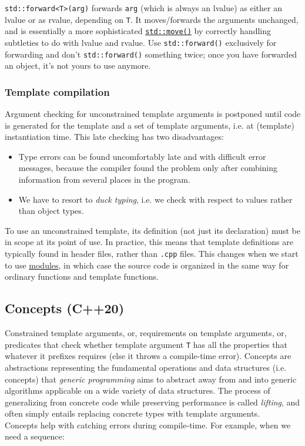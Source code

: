 \documentclass[table, xcdraw]{article}%
\begin{document}
\texttt{std::forward<T>(arg)} forwards \texttt{arg} (which is always an lvalue) as either an lvalue or as rvalue, depending on \texttt{T}. It moves/forwards the arguments unchanged, and is essentially a more sophisticated \href{}{\texttt{std::move()}} by correctly handling subtleties to do with lvalue and rvalue. Use \texttt{std::forward()} exclusively for forwarding and don't \texttt{std::forward()} something twice; once you have forwarded an object, it's not yours to use anymore.

\subsubsection{Template compilation}

Argument checking for unconstrained template arguments is postponed until code is generated for the template and a set of template arguments, i.e. at (template) instantiation time. This late checking has two disadvantages:

\begin{itemize}
    \item Type errors can be found uncomfortably late and with difficult error messages, because the compiler found the problem only after combining information from several places in the program.
    \item We have to resort to \emph{duck typing}, i.e. we check with respect to values rather than object types.
\end{itemize}

To use an unconstrained template, its definition (not just its declaration) must be in scope at its point of use. In practice, this means that template definitions are typically found in header files, rather than \texttt{.cpp} files. This changes when we start to use \hyperref[modules]{modules}, in which case the source code is organized in the same way for ordinary functions and template functions.

\subsection{Concepts (C++20)} \label{concepts}

Constrained template arguments, or, requirements on template arguments, or, predicates that check whether template argument \texttt{T} has all the properties that whatever it prefixes requires (else it throws a compile-time error). Concepts are abstractions representing the fundamental operations and data structures (i.e. concepts) that \emph{generic programming} aims to abstract away from and into generic algorithms applicable on a wide variety of data structures. The process of generalizing from concrete code while preserving performance is called \emph{lifting}, and often simply entails replacing concrete types with template arguments.\\
Concepts help with catching errors during compile-time. For example, when we need a sequence:
\end{document}
